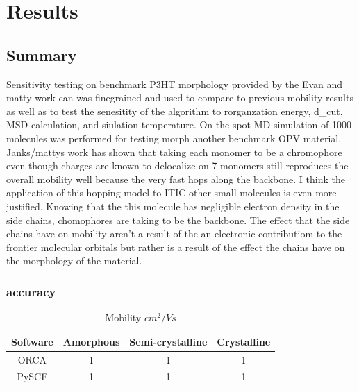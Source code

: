 \chapter{Results}
\label{chap:results}

\section{Summary}
Sensitivity testing on benchmark P3HT morphology provided by the Evan and matty work can was finegrained and
used to compare to previous mobility results as well as to test the senesitity of the algorithm to
rorganzation energy, d_cut, MSD calculation, and siulation temperature. On the spot MD simulation of 1000
molecules was performed for testing morph another benchmark OPV material. Janks/mattys work has shown that taking
each monomer to be a chromophore even though charges are known to delocalize on 7 monomers still reproduces
the overall mobility well because the very fast hops along the backbone. I think the application of this
hopping model to ITIC other small molecules is even more justified. Knowing that the this molecule has
negligible electron density in the side chains, chomophores are taking to be the backbone. The effect that
the side chains have on mobility aren't a result of the an electronic contributiom to the frontier molecular
orbitals but rather is a result of the effect the chains have on the morphology of the material. 

\subsection{accuracy}

\begin{table}[ht]
    \caption{Mobility $cm^{2}/Vs$} %
\centering %
\begin{tabular}{c c c c} %
\hline\hline %
Software & Amorphous & Semi-crystalline & Crystalline \\ [0.5ex] %
\hline %
ORCA & 1 & 1 & 1 \\ %
PySCF & 1 & 1 & 1 \\ [1ex] %
\hline %
\end{tabular}
\label{table:nonlin} %
\end{table}


